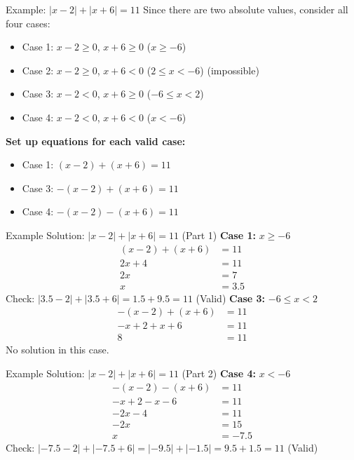 \documentclass[aspectratio=169]{beamer}
\begin{document}
\begin{frame}{Example: $|x-2| + |x+6| = 11$}
    \footnotesize
    Since there are two absolute values, consider all four cases:
    \begin{itemize}
        \item Case 1: $x-2 \geq 0$, $x+6 \geq 0$ ($x \geq -6$)
        \item Case 2: $x-2 \geq 0$, $x+6 < 0$ ($2 \leq x < -6$) (impossible)
        \item Case 3: $x-2 < 0$, $x+6 \geq 0$ ($-6 \leq x < 2$)
        \item Case 4: $x-2 < 0$, $x+6 < 0$ ($x < -6$)
    \end{itemize}
    \vspace{1em}
    \textbf{Set up equations for each valid case:}
    \begin{itemize}
        \item Case 1: $(x-2) + (x+6) = 11$
        \item Case 3: $-(x-2) + (x+6) = 11$
        \item Case 4: $-(x-2) - (x+6) = 11$
    \end{itemize}
\end{frame}

\begin{frame}{Example Solution: $|x-2| + |x+6| = 11$ (Part 1)}
    \footnotesize
    \textbf{Case 1:} $x \geq -6$
    \begin{align*}
        (x-2) + (x+6) &= 11 \\
        2x + 4 &= 11 \\
        2x &= 7 \\
        x &= 3.5
    \end{align*}
    Check: $|3.5-2| + |3.5+6| = 1.5 + 9.5 = 11$ (Valid)
    \vspace{1em}
    \textbf{Case 3:} $-6 \leq x < 2$
    \begin{align*}
        -(x-2) + (x+6) &= 11 \\
        -x+2+x+6 &= 11 \\
        8 &= 11
    \end{align*}
    No solution in this case.
\end{frame}

\begin{frame}{Example Solution: $|x-2| + |x+6| = 11$ (Part 2)}
    \footnotesize
    \textbf{Case 4:} $x < -6$
    \begin{align*}
        -(x-2) - (x+6) &= 11 \\
        -x+2-x-6 &= 11 \\
        -2x-4 &= 11 \\
        -2x &= 15 \\
        x &= -7.5
    \end{align*}
    Check: $|-7.5-2| + |-7.5+6| = |-9.5| + |-1.5| = 9.5 + 1.5 = 11$ (Valid)
\end{frame}
\end{document}
